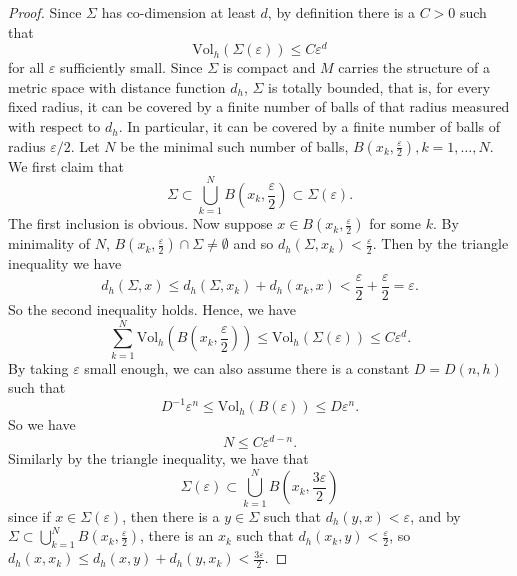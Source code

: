 \documentclass[12pt]{amsart}
\theoremstyle{remark}
\numberwithin{equation}{section}
\begin{document}
\begin{proof}
    Since $\Sigma$ has co-dimension at least $d$, by definition there is a $C > 0$ such that
    \begin{equation*}
        \text{Vol}_h(\Sigma(\varepsilon)) \leq C\varepsilon^d
    \end{equation*}
    for  all $\varepsilon$ sufficiently small. Since $\Sigma$ is compact and $M$ carries the structure of a metric space with distance function $d_h$, $\Sigma$ is totally bounded, that is, for every fixed radius, it can be covered by a finite number of balls of that radius measured with respect to $d_h$. In particular, it can be covered by a finite number of balls of radius $\varepsilon/2$. Let $N$ be the minimal such number of balls, $B(x_k, \frac{\varepsilon}{2}), k = 1,\dots,N$. We first claim that
    \begin{equation*}
        \Sigma \subset \bigcup\limits_{k=1}^N B\left(x_k,\frac{\varepsilon}{2}\right) \subset \Sigma(\varepsilon).
    \end{equation*}
    The first inclusion is obvious. Now suppose $x \in B(x_k,\frac{\varepsilon}{2})$ for some $k$. By minimality of $N$, $B(x_k,\frac{\varepsilon}{2})\cap\Sigma \neq \emptyset$ and so $d_h(\Sigma,x_k) < \frac{\varepsilon}{2}$. Then by the triangle inequality we have
    \begin{equation*}
        d_h(\Sigma, x) \leq d_h(\Sigma, x_k) + d_h(x_k, x) < \frac{\varepsilon}{2} + \frac{\varepsilon}{2} = \varepsilon.
    \end{equation*}
    So the second inequality holds. Hence, we have
    \begin{equation*}
        \sum_{k=1}^N\text{Vol}_h\left(B\left(x_k,\frac{\varepsilon}{2}\right)\right) \leq \text{Vol}_h(\Sigma(\varepsilon)) \leq C\varepsilon^d.
    \end{equation*}
    By taking $\varepsilon$ small enough, we can also assume there is a constant $D=D(n,h)$ such that
    \begin{equation*}
        D^{-1}\varepsilon^n \leq \text{Vol}_h(B(\varepsilon)) \leq D\varepsilon^n.
    \end{equation*}
    So we have
    \begin{equation}\label{eqn:distributional-scalar-curvature-N-estimate}
        N \leq C\varepsilon^{d-n}.
    \end{equation}
    Similarly by the triangle inequality, we have that
    \begin{equation*}
        \Sigma(\varepsilon) \subset \bigcup\limits_{k=1}^N B\left(x_k,\frac{3\varepsilon}{2}\right)
    \end{equation*}
    since if $x \in \Sigma(\varepsilon)$, then there is a $y \in \Sigma$ such that $d_h(y,x) < \varepsilon$, and by $\Sigma \subset \bigcup\limits_{k=1}^N B\left(x_k,\frac{\varepsilon}{2}\right)$, there is an $x_k$ such that $d_h(x_k, y) < \frac{\varepsilon}{2}$, so $d_h(x,x_k) \leq d_h(x,y) + d_h(y,x_k) < \frac{3\varepsilon}{2}$.


\end{proof}
\end{document}
